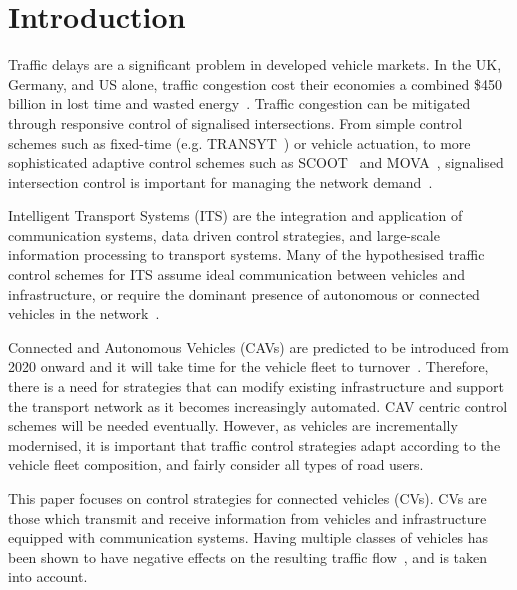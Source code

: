 \documentclass[numbered]{trbunofficial}
\begin{document}
\section{Introduction}\label{sec:intro}
Traffic delays are a significant problem in developed vehicle markets. In the UK, Germany, and US alone, traffic congestion cost their economies a combined \$450 billion in lost time and wasted energy~\cite{inrixgts17}.
Traffic congestion can be mitigated through responsive control of signalised intersections. From simple control schemes such as fixed-time (e.g. TRANSYT~\cite{robertson69}) or vehicle actuation, to more sophisticated adaptive control schemes such as SCOOT~\cite{hunt1981} and MOVA~\cite{vincent88}, signalised intersection control is important for managing the network demand~\cite{papageorgiou2003}. 

Intelligent Transport Systems (ITS) are the integration and application of communication systems, data driven control strategies, and large-scale information processing to transport systems. Many of the hypothesised traffic control schemes for ITS assume ideal communication between vehicles and infrastructure, or require the dominant presence of autonomous or connected vehicles in the network~\cite{goodall2013, Au2015, HomChaudhuri2016}. 

Connected and Autonomous Vehicles (CAVs) are predicted to be introduced from 2020 onward and it will take time for the vehicle fleet to turnover~\cite{litman2016}. Therefore, there is a need for strategies that can modify existing infrastructure and support the transport network as it becomes increasingly automated. CAV centric control schemes will be needed eventually. However, as vehicles are incrementally modernised, it is important that traffic control strategies adapt according to the vehicle fleet composition, and fairly consider all types of road users.

This paper focuses on control strategies for connected vehicles (CVs). CVs are those which transmit and receive information from vehicles and infrastructure equipped with communication systems. Having multiple classes of vehicles has been shown to have negative effects on the resulting traffic flow~\cite{Ngoduy2012, Ngoduy2014}, and is taken into account.
\end{document}
